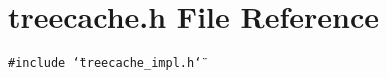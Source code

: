 \section{treecache.h File Reference}
\label{treecache_8h}
{\tt \#include \char`\"{}treecache\_\-impl.h\char`\"{}}\par
